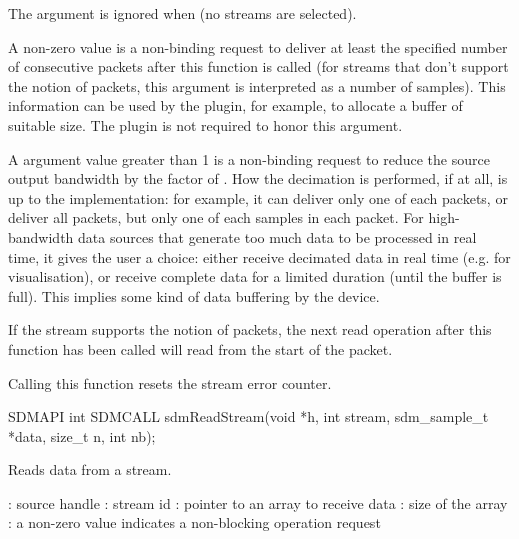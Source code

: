 \documentclass[a4paper,12pt,twoside,extrafontsizes]{memoir}
\begin{document}
\begin{funcremarks}
	The  argument is ignored when  (no streams are selected).
	
	A non-zero  value is a non-binding request to deliver at least the specified number of consecutive packets after this function is called (for streams that don't support the notion of packets, this argument is interpreted as a number of samples). This information can be used by the plugin, for example, to allocate a buffer of suitable size. The plugin is not required to honor this argument.
	
	A  argument value greater than 1 is a non-binding request to reduce the source output bandwidth by the factor of . How the decimation is performed, if at all, is up to the implementation: for example, it can deliver only one of each  packets, or deliver all packets, but only one of each  samples in each packet. For high-bandwidth data sources that generate too much data to be processed in real time, it gives the user a choice: either receive decimated data in real time (e.g. for visualisation), or receive complete data for a limited duration (until the buffer is full). This implies some kind of data buffering by the device.
	
	If the stream supports the notion of packets, the next read operation after this function has been called will read from the start of the packet.
	
	Calling this function resets the stream error counter.
\end{funcremarks}



\begin{cfuncprototype}
SDMAPI int SDMCALL sdmReadStream(void *h, int stream, sdm_sample_t *data, size_t n, int nb);
\end{cfuncprototype}

\begin{funcdescr}
	Reads data from a stream.
\end{funcdescr}

\begin{funcparams}
	: source handle
	: stream id
	: pointer to an array to receive data
	: size of the array
	: a non-zero value indicates a non-blocking operation request
\end{funcparams}
\end{document}
